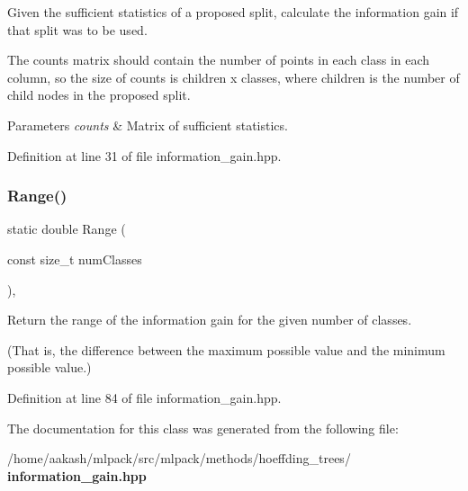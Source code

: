 Given the sufficient statistics of a proposed split, calculate the information gain if that split was to be used. 

The \textquotesingle{}counts\textquotesingle{} matrix should contain the number of points in each class in each column, so the size of \textquotesingle{}counts\textquotesingle{} is children x classes, where \textquotesingle{}children\textquotesingle{} is the number of child nodes in the proposed split.


\begin{DoxyParams}{Parameters}
{\em counts} & Matrix of sufficient statistics. \\
\hline
\end{DoxyParams}


Definition at line 31 of file information\+\_\+gain.\+hpp.

\mbox{\label{classmlpack_1_1tree_1_1HoeffdingInformationGain_a9d801bb1be5db5207213f846f224458f}} 
\subsubsection{Range()}
{\footnotesize\ttfamily static double Range (\begin{DoxyParamCaption}\item[{const size\+\_\+t}]{num\+Classes }\end{DoxyParamCaption})\hspace{0.3cm}{\ttfamily [inline]}, {\ttfamily [static]}}



Return the range of the information gain for the given number of classes. 

(That is, the difference between the maximum possible value and the minimum possible value.) 

Definition at line 84 of file information\+\_\+gain.\+hpp.



The documentation for this class was generated from the following file\+:\begin{DoxyCompactItemize}
\item 
/home/aakash/mlpack/src/mlpack/methods/hoeffding\+\_\+trees/\textbf{ information\+\_\+gain.\+hpp}\end{DoxyCompactItemize}
